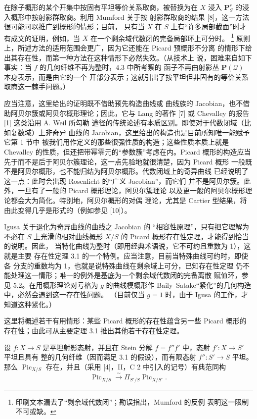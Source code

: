 在除子概形的某个开集中按固有平坦等价关系取商，被替换为在 $X$
浸入 $\mathbf P^r_S$ 的浸入概形中按射影群取商。利用 Mumford 关于按
射影群取商的结果 [8]，这一方法很可能可以推广到概形的情形；目前，
只有当 $X$ 在 $S$ 上有“许多局部截面”时才有成文的证明，例如，当
$X$ 在一个剩余域代数闭的完备局部环上可分时。
\footnote{印刷文本漏去了“剩余域代数闭”；勘误指出，Mumford 的反例
表明这一限制不可或缺。}
原则上，所述方法的适用范围会更广，因为它还能在 Picard 预概形不分离
的情形下给出其存在性，而第一种方法在这种情形下必然失效。（从技术上
说，困难来自如下事实：当 $f$ 的几何纤维不再为整时，4.3 中所考察的
函子不再由射影丛 $\mathbf P(\mathcal Q)$ 本身表示，而是由它的一个
开部分表示；这就引出了按平坦但非固有的等价关系取商这一棘手问题。）

 应当注意，这里给出的证明既不借助预先构造曲线或
曲线族的 Jacobian，也不借助阿贝尔簇或阿贝尔概形理论；因此，它与
Lang 的著作 [7] 或 Chevalley 的报告 [1] 这类沿用 A. Weil 所勾勒
途径的传统论述有本质区别。即使对于代数闭域（比如复数域）上非奇异
曲线的 Jacobian，这里给出的构造也是目前所知唯一能赋予它第 1 节中
被我们用作定义的那些很强性质的构造；这些性质本质上就是 Chevalley
的性质，但还把带幂零元的“参数簇”考虑在内。Picard 概形的构造应当
先于而不是后于阿贝尔簇理论，这一点先验地就很清楚，因为 Picard 概形
一般既不是阿贝尔概形，也不能归结为阿贝尔概形。代数闭域上的奇异曲线
已经说明了这一点：此时会出现 Rosenlicht 的“广义 Jacobian”，而它们
并不是阿贝尔簇。此外，一旦有了一般的 Picard 概形理论，阿贝尔簇理论
以及更一般的阿贝尔概形理论都会大为简化。特别地，阿贝尔概形的对偶
理论，尤其是 Cartier 型结果，将由此变得几乎是形式的（例如参见
[10]）。

 Igusa 关于退化为奇异曲线的曲线之 Jacobian 的
“相容性原理”，只有把它理解为不必在 $S$ 上光滑的相对曲线概形
$X/S$ 的 Picard 概形存在性定理，才能得到恰当的说明。因此，
当特化曲线为整时（即用经典术语说，它不可约且重数为 1），这就是主要
存在性定理 3.1 的一个特例。应当注意，目前当特殊曲线可约时，即使各
分支的重数均为 1，也就是说特殊曲线在剩余域上可分，已知存在性定理
仍不能处理这一情形；唯一的例外是基底为一个剩余域代数闭的完备离散
赋值环，参见 5.2。在用概形理论对亏格为 $g$ 的曲线模概形作
Baily--Satake“紧化”的几何构造中，必然会遇到这一存在性问题。
（目前仅当 $g=1$ 时，由于 Igusa 的工作，才知道这种紧化。）


这里将概述若干有用情形：某些 Picard 概形的存在性蕴含另一些 Picard
概形的存在性；由此可从主要定理 3.1 推出其他若干存在性定理。

 设 $f:X\longrightarrow S$ 是平坦射影态射，并且在
Stein 分解 $f=f''f'$ 中，态射 $f':X\longrightarrow S'$ 平坦且具有
整的几何纤维（因而满足 3.1 的假设），而有限态射
$f'':S'\longrightarrow S$ 平坦。那么 $\operatorname{Pic}_{X/S}$
存在，并且（采用 [4]，II，C 2 中引入的记号）有典范同构
\[
\operatorname{Pic}_{X/S}\xrightarrow{\sim}
\Pi_{S'/S}\operatorname{Pic}_{X/S'}.
\]

